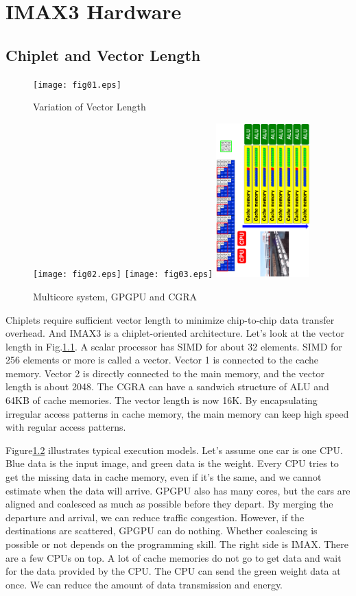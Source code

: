 
\chapter{IMAX3 Hardware}

\section{Chiplet and Vector Length}

\begin{figure}[htbp]
\center
\texttt{[image: fig01.eps]}
\caption{\label{fig:vl}Variation of Vector Length}
\end{figure}

\begin{figure}[htbp]
\center
\texttt{[image: fig02.eps]}
\texttt{[image: fig03.eps]}
\includegraphics[angle=270,origin=b,width=0.32\textwidth]{fig04.eps}
\caption{\label{fig:comp}Multicore system, GPGPU and CGRA}
\end{figure}

Chiplets require sufficient vector length to minimize chip-to-chip data
transfer overhead. And IMAX3 is a chiplet-oriented architecture. Let's look
at the vector length in Fig.\ref{fig:vl}. A scalar processor has SIMD for
about 32 elements.  SIMD for 256 elements or more is called a vector. Vector
1 is connected to the cache memory.  Vector 2 is directly connected to the
main memory, and the vector length is about 2048.  The CGRA can have a
sandwich structure of ALU and 64KB of cache memories. The vector length is
now 16K.  By encapsulating irregular access patterns in cache memory, the
main memory can keep high speed with regular access patterns.

Figure\ref{fig:comp} illustrates typical execution models. Let's assume one
car is one CPU.  Blue data is the input image, and green data is the weight.
Every CPU tries to get the missing data in cache memory, even if it's the
same, and we cannot estimate when the data will arrive. GPGPU also has many
cores, but the cars are aligned and coalesced as much as possible before
they depart.  By merging the departure and arrival, we can reduce traffic
congestion.  However, if the destinations are scattered, GPGPU can do
nothing.  Whether coalescing is possible or not depends on the programming
skill. The right side is IMAX.  There are a few CPUs on top.  A lot of cache
memories do not go to get data and wait for the data provided by the CPU.
The CPU can send the green weight data at once.  We can reduce the amount of
data transmission and energy.

